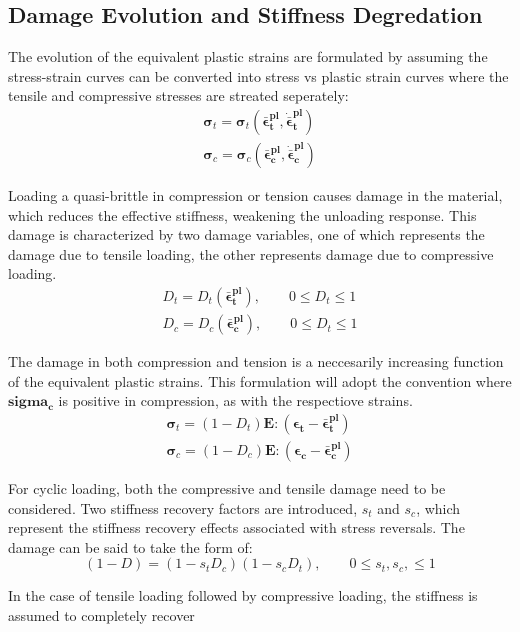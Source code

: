 \subsection{Damage Evolution and Stiffness Degredation}

The evolution of the equivalent plastic strains are formulated by assuming the stress-strain curves can be converted  into stress vs plastic strain curves where the tensile and compressive stresses are streated seperately:
\begin{equation}
\label{eqn:dam1}
\begin{aligned}
\boldsymbol{\sigma}_t = \boldsymbol{\sigma}_t(\boldsymbol{\bar{\epsilon}^{pl}_t},
	\boldsymbol{\dot{\bar{\epsilon}}^{pl}_t}) \\
\boldsymbol{\sigma}_c = \boldsymbol{\sigma}_c(\boldsymbol{\bar{\epsilon}^{pl}_c},
	\boldsymbol{\dot{\bar{\epsilon}}^{pl}_c})
\end{aligned}
\end{equation}

Loading a quasi-brittle in compression or tension causes damage in the material, which reduces the effective stiffness, weakening the unloading response. This damage is characterized by two damage variables, one of which represents the damage due to tensile loading, the other represents damage due to compressive loading. 
\begin{equation}
\label{eqn:dam2}
\begin{aligned}
D_t = D_t(\boldsymbol{\bar{\epsilon}^{pl}_t}),\qquad 0 \leq D_t \leq 1 \\
D_c = D_c(\boldsymbol{\bar{\epsilon}^{pl}_c}),\qquad 0 \leq D_t \leq 1
\end{aligned}
\end{equation}

The damage in both compression and tension is a neccesarily increasing function of the equivalent plastic strains. This formulation will adopt the convention where $\boldsymbol{sigma_c}$ is positive in compression, as with the respectiove strains.
\begin{equation}
\label{eqn:dam3}
\begin{aligned}
\boldsymbol{\sigma}_t = (1-D_t)\mathbf{E}:(\boldsymbol{\epsilon_t} - \boldsymbol{\bar{\epsilon}^{pl}_t}) \\
\boldsymbol{\sigma}_c = (1-D_c)\mathbf{E}:(\boldsymbol{\epsilon_c} - \boldsymbol{\bar{\epsilon}^{pl}_c})
\end{aligned}
\end{equation}

For cyclic loading, both the compressive and tensile damage need to be considered. Two stiffness recovery factors are introduced, $s_t$ and $s_c$, which represent the stiffness recovery effects associated with stress reversals. The damage can be said to take the form of:
\begin{equation}
\label{eqn:dam4}
(1-D) = (1-s_t D_c)(1-s_c D_t),\qquad 0 \leq s_t, s_c, \leq 1
\end{equation}

In the case of tensile loading followed by compressive loading, the stiffness is assumed to completely recover




